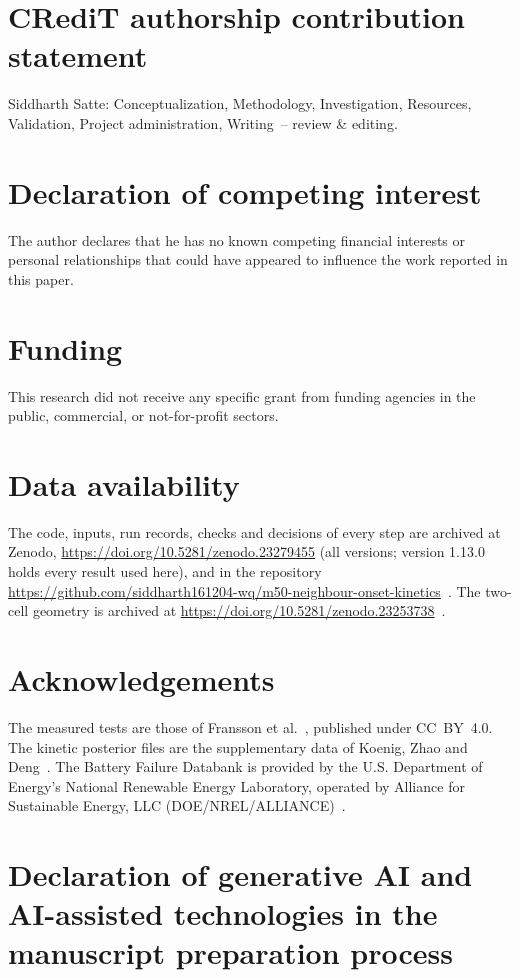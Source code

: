 \documentclass[preprint,12pt]{elsarticle}
\begin{document}
\section*{CRediT authorship contribution statement}
Siddharth Satte: Conceptualization, Methodology, Investigation, Resources, Validation, Project administration, Writing~-- review \& editing.

\section*{Declaration of competing interest}
The author declares that he has no known competing financial interests or personal relationships that could have appeared to influence the work reported in this paper.

\section*{Funding}
This research did not receive any specific grant from funding agencies in the public, commercial, or not-for-profit sectors.

\section*{Data availability}
The code, inputs, run records, checks and decisions of every step are archived at Zenodo, \url{https://doi.org/10.5281/zenodo.23279455} (all versions; version 1.13.0 holds every result used here), and in the repository \url{https://github.com/siddharth161204-wq/m50-neighbour-onset-kinetics}~\cite{satte2026repo}. The two-cell geometry is archived at \url{https://doi.org/10.5281/zenodo.23253738}~\cite{satte2026twocell}.

\section*{Acknowledgements}
The measured tests are those of Fransson et al.~\cite{fransson2024exploring}, published under CC~BY~4.0. The kinetic posterior files are the supplementary data of Koenig, Zhao and Deng~\cite{koenig2025uncertainty}. The Battery Failure Databank is provided by the U.S. Department of Energy's National Renewable Energy Laboratory, operated by Alliance for Sustainable Energy, LLC (DOE/\allowbreak NREL/\allowbreak ALLIANCE)~\cite{finegan2024databank}.

\section*{Declaration of generative AI and AI-assisted technologies in the manuscript preparation process}




\end{document}

